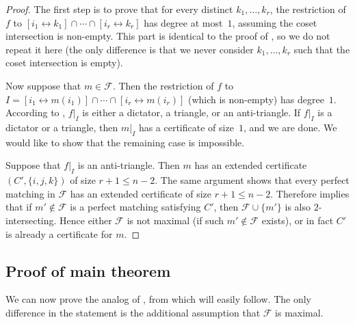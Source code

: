 \documentclass[10pt,a4paper]{amsart}
\theoremstyle{definition}
\providecommand{\dcoset}[2]{[#1 \leftrightarrow #2]}
\begin{document}
\begin{proof}
The first step is to prove that for every distinct $k_1,\ldots,k_r$, the restriction of $f$ to $\dcoset{i_1}{k_1} \cap \cdots \cap \dcoset{i_r}{k_r}$ has degree at most~$1$, assuming the coset intersection is non-empty. This part is identical to the proof of , so we do not repeat it here (the only difference is that we never consider $k_1,\ldots,k_r$ such that the coset intersection is empty).

Now suppose that $m \in \mathcal{F}$. Then the restriction of $f$ to $I = \dcoset{i_1}{m(i_1)} \cap \cdots \cap \dcoset{i_r}{m(i_r)}$ (which is non-empty) has degree~$1$. According to , $f|_I$ is either a dictator, a triangle, or an anti-triangle. If $f|_I$ is a dictator or a triangle, then $m|_I$ has a certificate of size~$1$, and we are done. We would like to show that the remaining case is impossible.

Suppose that $f|_I$ is an anti-triangle. Then $m$ has an extended certificate $(C',\{i,j,k\})$ of size $r+1 \leq n-2$. The same argument shows that every perfect matching in $\mathcal{F}$ has an extended certificate of size $r+1 \leq n-2$. Therefore  implies that if $m' \notin \mathcal{F}$ is a perfect matching satisfying $C'$, then $\mathcal{F} \cup \{m'\}$ is also $2$-intersecting. Hence either $\mathcal{F}$ is not maximal (if such $m' \notin \mathcal{F}$ exists), or in fact $C'$ is already a certificate for $m$.
\end{proof}

\subsection{Proof of main theorem} \label{sec:proof-pms}

We can now prove the analog of , from which  will easily follow. The only difference in the statement is the additional assumption that $\mathcal{F}$ is maximal.
\end{document}
